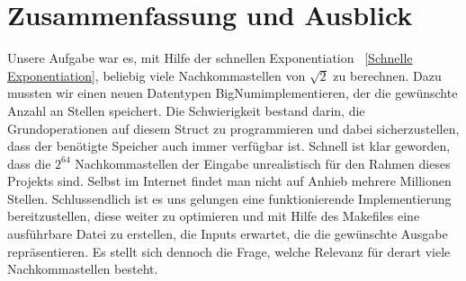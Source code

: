 \documentclass[course=erap]{aspdoc}
\begin{document}
    \section{Zusammenfassung und Ausblick}
    Unsere Aufgabe war es, mit Hilfe der schnellen Exponentiation ~\ref{Schnelle Exponentiation}, beliebig viele Nachkommastellen von $\sqrt{2}$ zu berechnen. Dazu mussten wir einen neuen Datentypen \glqq BigNum\grqq\space implementieren, der die gewünschte Anzahl an Stellen speichert. Die Schwierigkeit bestand darin, die Grundoperationen auf diesem Struct zu programmieren und dabei sicherzustellen, dass der benötigte Speicher auch immer verfügbar ist. Schnell ist klar geworden, dass die $2^{64}$ Nachkommastellen der Eingabe unrealistisch für den Rahmen dieses Projekts sind. Selbst im Internet findet man nicht auf Anhieb mehrere Millionen Stellen. Schlussendlich ist es uns gelungen eine funktionierende Implementierung bereitzustellen, diese weiter zu optimieren und mit Hilfe des Makefiles eine ausführbare Datei zu erstellen, die Inputs erwartet, die die gewünschte Ausgabe repräsentieren. Es stellt sich dennoch die Frage, welche Relevanz für derart viele Nachkommastellen besteht.

    
    
\end{document}
